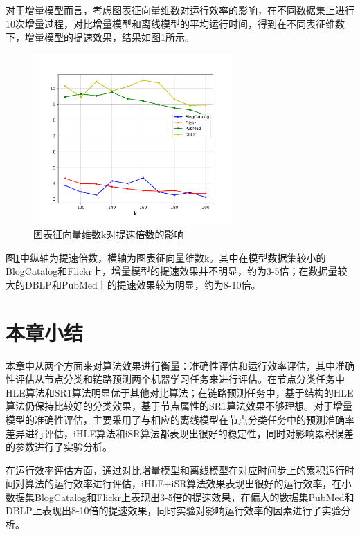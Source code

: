 对于增量模型而言，考虑图表征向量维数对运行效率的影响，在不同数据集上进行10次增量过程，对比增量模型和离线模型的平均运行时间，得到在不同表征维数下，增量模型的提速效果，结果如图\ref{fig:dimension_speedup}所示。
\begin{figure}
	\centering
	\includegraphics[width=3in]{figures/demension_speedup}
	\caption{图表征向量维数k对提速倍数的影响}
	\label{fig:dimension_speedup}
\end{figure}

图\ref{fig:dimension_speedup}中纵轴为提速倍数，横轴为图表征向量维数k。其中在模型数据集较小的BlogCatalog和Flickr上，增量模型的提速效果并不明显，约为3-5倍；在数据量较大的DBLP和PubMed上的提速效果较为明显，约为8-10倍。

\section{本章小结}
本章中从两个方面来对算法效果进行衡量：准确性评估和运行效率评估，其中准确性评估从节点分类和链路预测两个机器学习任务来进行评估。在节点分类任务中HLE算法和SR1算法明显优于其他对比算法；在链路预测任务中，基于结构的HLE算法仍保持比较好的分类效果，基于节点属性的SR1算法效果不够理想。对于增量模型的准确性评估，主要采用了与相应的离线模型在节点分类任务中的预测准确率差异进行评估，iHLE算法和iSR算法都表现出很好的稳定性，同时对影响累积误差的参数进行了实验分析。

在运行效率评估方面，通过对比增量模型和离线模型在对应时间步上的累积运行时间对算法的运行效率进行评估，iHLE+iSR算法效果表现出很好的运行效率，在小数据集BlogCatalog和Flickr上表现出3-5倍的提速效果，在偏大的数据集PubMed和DBLP上表现出8-10倍的提速效果，同时实验对影响运行效率的因素进行了实验分析。